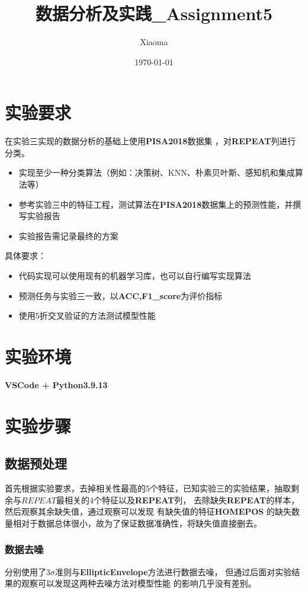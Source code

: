\documentclass[12pt, a4paper, oneside]{ctexart}
\title{数据分析及实践\_Assignment5}
\author{Xiaoma}
\date{\today}
\begin{document}
\maketitle
\section{实验要求}
在实验三实现的数据分析的基础上使用\textbf{PISA2018}数据集
，对\textbf{REPEAT}列进行分类。
\begin{itemize}
    \item 实现至少一种分类算法（例如：决策树、KNN、朴素贝叶斯、感知机和集成算法等）
    \item 参考实验三中的特征工程，测试算法在\textbf{PISA2018}数据集上的预测性能，并撰写实验报告
    \item 实验报告需记录最终的方案
\end{itemize}

具体要求：
\begin{itemize}
    \item 代码实现可以使用现有的机器学习库，也可以自行编写实现算法
    \item 预测任务与实验三一致，以\textbf{ACC,F1\_score}为评价指标
    \item 使用5折交叉验证的方法测试模型性能
\end{itemize}
\newpage

\section{实验环境}
\textbf{VSCode + Python3.9.13}
\section{实验步骤}
\subsection{数据预处理}
首先根据实验要求，去掉相关性最高的5个特征，已知实验三的实验结果，抽取剩余与$REPEAT$最相关的4个特征以及\textbf{REPEAT}列，
去除缺失\textbf{REPEAT}的样本，然后观察其余缺失值，通过观察可以发现
有缺失值的特征\textbf{HOMEPOS}
的缺失数量相对于数据总体很小，故为了保证数据准确性，将缺失值直接删去。

\subsubsection{数据去噪}
分别使用了$3\sigma$准则与\textbf{EllipticEnvelope}方法进行数据去噪，
但通过后面对实验结果的观察可以发现这两种去噪方法对模型性能
的影响几乎没有差别。
\end{document}
